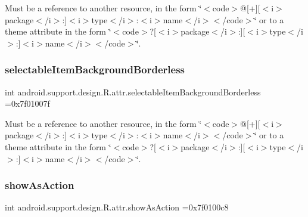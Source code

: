Must be a reference to another resource, in the form \char`\"{}$<$code$>$@\mbox{[}+\mbox{]}\mbox{[}$<$i$>$package$<$/i$>$\+:\mbox{]}$<$i$>$type$<$/i$>$\+:$<$i$>$name$<$/i$>$$<$/code$>$\char`\"{} or to a theme attribute in the form \char`\"{}$<$code$>$?\mbox{[}$<$i$>$package$<$/i$>$\+:\mbox{]}\mbox{[}$<$i$>$type$<$/i$>$\+:\mbox{]}$<$i$>$name$<$/i$>$$<$/code$>$\char`\"{}. \mbox{\label{classandroid_1_1support_1_1design_1_1R_1_1attr_ab7ce9e711117ab9af03c5d753d9124dc}} 
\subsubsection{\texorpdfstring{selectable\+Item\+Background\+Borderless}{selectableItemBackgroundBorderless}}
{\footnotesize\ttfamily int android.\+support.\+design.\+R.\+attr.\+selectable\+Item\+Background\+Borderless =0x7f01007f\hspace{0.3cm}{\ttfamily [static]}}

Must be a reference to another resource, in the form \char`\"{}$<$code$>$@\mbox{[}+\mbox{]}\mbox{[}$<$i$>$package$<$/i$>$\+:\mbox{]}$<$i$>$type$<$/i$>$\+:$<$i$>$name$<$/i$>$$<$/code$>$\char`\"{} or to a theme attribute in the form \char`\"{}$<$code$>$?\mbox{[}$<$i$>$package$<$/i$>$\+:\mbox{]}\mbox{[}$<$i$>$type$<$/i$>$\+:\mbox{]}$<$i$>$name$<$/i$>$$<$/code$>$\char`\"{}. \mbox{\label{classandroid_1_1support_1_1design_1_1R_1_1attr_a8e31fca542d0605aaee166fed8a798b6}} 
\subsubsection{\texorpdfstring{show\+As\+Action}{showAsAction}}
{\footnotesize\ttfamily int android.\+support.\+design.\+R.\+attr.\+show\+As\+Action =0x7f0100c8\hspace{0.3cm}{\ttfamily [static]}}

